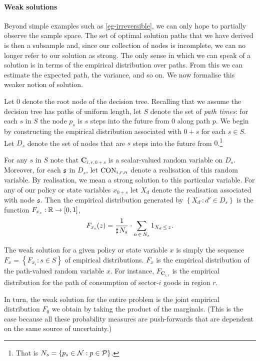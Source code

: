 \documentclass[12pt,a4paper,twoside, draft]{article}
\begin{document}
\paragraph{Weak solutions}
Beyond simple examples such as \cref{eg-irreversible}, we can only hope to
partially observe the sample space.
The set of optimal solution paths that we have derived is then a subsample and,
since our collection of nodes is incomplete, we can no longer refer to our
solution as strong.
The only sense in which we can speak of a solution is in terms of the empirical
distribution over paths. 
From this we can estimate the expected path, the variance, and so on.
We now formalise this weaker notion of solution.

Let $\mathfrak{0}$ denote the root node of the decision tree.
Recalling that we assume the decision tree has paths of uniform length, let $S$
denote the set of \emph{path times}: for each $s$ in $S$ the node $p_s$ is $s$
steps into the future from $\mathfrak{0}$ along path $p$.
We begin by constructing the empirical distribution associated with
$\mathfrak{0} + s$ for each $s \in S$.
Let $D_s$ denote the set of nodes that are $s$ steps into the future from
$\mathfrak{0}$.\footnote{
   That is $N_{s} = \left\{ p_{s} \in \mathcal N : p \in \mathcal P\right\}$.
}

For any $s$ in $S$ note that $\mathbf{C}_{i, r, \mathfrak{0} + s}$ is a
scalar-valued random variable on $D_s$. 
Moreover, for each $\mathfrak{s}$ in $D_s$, let $\textup{CON}_{i, r, n}$ denote a
realisation of this random variable.
By realisation, we mean a strong solution to this particular variable.
For any of our policy or state variables $x_{\mathfrak{0}+s}$ let $X_d$ denote
the realisation associated with node $\mathfrak{s}$.
Then the empirical distribution generated by $\left\{X_{d'}: d' \in D_s\right\}$ is
the function
$F_{x_{s}} : \mathbb R \rightarrow [0, 1]$,
\begin{equation}\label{eq-empirical-dbn}
   F_{x_s}(z) = \frac{1}{\mathbin{\sharp}\hskip1pt N_{s}}
   \cdot \sum_{n \,\in\, N_{s}} 1_{X_d \,\leq\, z}.
\end{equation}

The weak solution for a given policy or state variable $x$ is simply the
sequence $F_{x} = \left\{F_{x_{s}}: s \in S\right\}$ of empirical distributions.
$F_{x}$ is the empirical distribution of the path-valued random variable $x$.
For instance, $F_{\mathbf{C}_{i, r}}$ is the empirical distribution for the
path of consumption of sector-$i$ goods in region $r$.

In turn, the weak solution for the entire problem is the joint empirical
distribution $F_{\mathfrak{0}}$ we obtain by taking the product of the
marginals.
(This is the case because all these probability measures are push-forwards that
are dependent on the same source of uncertainty.)
\end{document}

